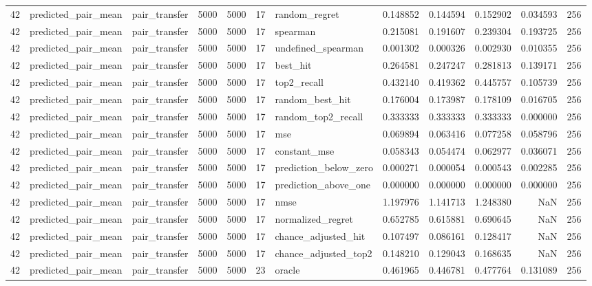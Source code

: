 \begin{tabular}{rllrrrlrrrrr}
42 & predicted_pair_mean & pair_transfer & 5000 & 5000 & 17 & random_regret & 0.148852 & 0.144594 & 0.152902 & 0.034593 & 256 \\
42 & predicted_pair_mean & pair_transfer & 5000 & 5000 & 17 & spearman & 0.215081 & 0.191607 & 0.239304 & 0.193725 & 256 \\
42 & predicted_pair_mean & pair_transfer & 5000 & 5000 & 17 & undefined_spearman & 0.001302 & 0.000326 & 0.002930 & 0.010355 & 256 \\
42 & predicted_pair_mean & pair_transfer & 5000 & 5000 & 17 & best_hit & 0.264581 & 0.247247 & 0.281813 & 0.139171 & 256 \\
42 & predicted_pair_mean & pair_transfer & 5000 & 5000 & 17 & top2_recall & 0.432140 & 0.419362 & 0.445757 & 0.105739 & 256 \\
42 & predicted_pair_mean & pair_transfer & 5000 & 5000 & 17 & random_best_hit & 0.176004 & 0.173987 & 0.178109 & 0.016705 & 256 \\
42 & predicted_pair_mean & pair_transfer & 5000 & 5000 & 17 & random_top2_recall & 0.333333 & 0.333333 & 0.333333 & 0.000000 & 256 \\
42 & predicted_pair_mean & pair_transfer & 5000 & 5000 & 17 & mse & 0.069894 & 0.063416 & 0.077258 & 0.058796 & 256 \\
42 & predicted_pair_mean & pair_transfer & 5000 & 5000 & 17 & constant_mse & 0.058343 & 0.054474 & 0.062977 & 0.036071 & 256 \\
42 & predicted_pair_mean & pair_transfer & 5000 & 5000 & 17 & prediction_below_zero & 0.000271 & 0.000054 & 0.000543 & 0.002285 & 256 \\
42 & predicted_pair_mean & pair_transfer & 5000 & 5000 & 17 & prediction_above_one & 0.000000 & 0.000000 & 0.000000 & 0.000000 & 256 \\
42 & predicted_pair_mean & pair_transfer & 5000 & 5000 & 17 & nmse & 1.197976 & 1.141713 & 1.248380 & NaN & 256 \\
42 & predicted_pair_mean & pair_transfer & 5000 & 5000 & 17 & normalized_regret & 0.652785 & 0.615881 & 0.690645 & NaN & 256 \\
42 & predicted_pair_mean & pair_transfer & 5000 & 5000 & 17 & chance_adjusted_hit & 0.107497 & 0.086161 & 0.128417 & NaN & 256 \\
42 & predicted_pair_mean & pair_transfer & 5000 & 5000 & 17 & chance_adjusted_top2 & 0.148210 & 0.129043 & 0.168635 & NaN & 256 \\
42 & predicted_pair_mean & pair_transfer & 5000 & 5000 & 23 & oracle & 0.461965 & 0.446781 & 0.477764 & 0.131089 & 256 \\

\end{tabular}

